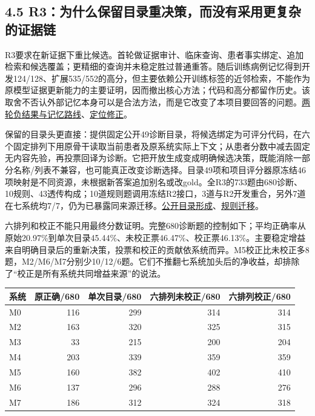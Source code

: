 \documentclass[
  11pt,
  a4paper,
]{article}
\newcounter{none} %
\begin{document}
\subsection{4.5
R3：为什么保留目录重决策，而没有采用更复杂的证据链}\label{r3ux4e3aux4ec0ux4e48ux4fddux7559ux76eeux5f55ux91cdux51b3ux7b56ux800cux6ca1ux6709ux91c7ux7528ux66f4ux590dux6742ux7684ux8bc1ux636eux94fe}

R3要求在新证据下重比候选。首轮做证据审计、临床查询、患者事实绑定、追加检索和候选覆盖；更精细的查询并未稳定胜过普通重答。随后训练病例记忆得到开发124/128、扩展535/552的高分，但主要依赖公开训练标签的近邻检索，不能作为原模型证据更新能力的主要证明，因而撤出核心方法；代码和高分都留作历史。该取舍不否认外部记忆本身可以是合法方法，而是它改变了本项目要回答的问题。\href{https://github.com/xiotakut/cf_mrg/blob/main/papers/2026-10-02_cf_moa/author_dossier/records/research/r3_candidate_comparison.md\#L53}{两轮负结果与记忆路线}、\href{https://github.com/xiotakut/cf_mrg/blob/main/papers/2026-10-02_cf_moa/author_dossier/records/research/r3_candidate_comparison.md\#L344}{定位修正}。

保留的目录头更直接：提供固定公开49诊断目录，将候选绑定为可评分代码，在六个固定排列下用原骨干读取当前患者及原系统实际上下文；从患者分数中减去固定无内容先验，再投票回译为诊断。它把开放生成变成明确候选决策，既能消除一部分名称/列表不兼容，也可能真正改变诊断选择。目录49项和项目评分器原冻结46项映射是不同资源，未根据新答案追加别名或改gold。全R3的733题由680诊断、10规则、43透传构成；10道规则题调用冻结R2接口，3道与R2开发重合，另外7道在七系统均7/7，仍为已暴露同来源迁移。\href{https://github.com/xiotakut/cf_mrg/blob/main/papers/2026-10-02_cf_moa/author_dossier/records/research/r3_candidate_comparison.md\#L478}{公开目录形成}、\href{https://github.com/xiotakut/cf_mrg/blob/main/papers/2026-10-02_cf_moa/author_dossier/records/research/r3_candidate_comparison.md\#L1237}{规则迁移}。

六排列和校正不能只用最终分数证明。完整680诊断题的控制如下；平均正确率从原始20.97\%到单次目录45.44\%、未校正票46.47\%、校正票46.13\%。主要稳定增益来自明确目录后的重新决策，投票和校正的贡献依系统而异。M5校正比未校正多8题，M2/M6/M7分别少10/12/6题。它们不推翻七系统加头后的净收益，却排除了``校正是所有系统共同增益来源''的说法。

{\def\LTcaptype{none} %
\begin{longtable}[]{@{}lrrrr@{}}
\toprule\noalign{}
系统 & 原正确/680 & 单次目录/680 & 六排列未校正/680 & 六排列校正/680 \\
\midrule\noalign{}
\endhead
\bottomrule\noalign{}
\endlastfoot
M0 & 116 & 299 & 314 & 314 \\
M2 & 163 & 320 & 325 & 315 \\
M3 & 33 & 215 & 200 & 204 \\
M4 & 203 & 339 & 359 & 359 \\
M5 & 160 & 382 & 402 & 410 \\
M6 & 137 & 296 & 288 & 276 \\
M7 & 186 & 312 & 324 & 318 \\
\end{longtable}
}
\end{document}
